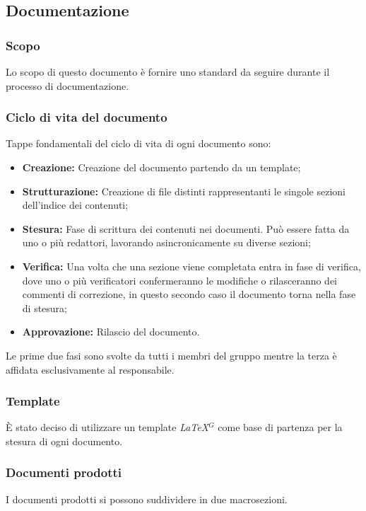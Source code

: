 \subsection{Documentazione}

\subsubsection{Scopo}
Lo scopo di questo documento è fornire uno standard da seguire durante il processo di documentazione.

\subsubsection{Ciclo di vita del documento}
Tappe fondamentali del ciclo di vita di ogni documento sono:
  \begin{itemize}
    \item \textbf{Creazione:} Creazione del documento partendo da un template;
    \item \textbf{Strutturazione:} Creazione di file distinti rappresentanti le singole sezioni dell'indice dei contenuti;
    \item \textbf{Stesura:} Fase di scrittura dei contenuti nei documenti. Può essere fatta da uno o più redattori, lavorando asincronicamente su diverse sezioni;
    \item \textbf{Verifica:} Una volta che una sezione viene completata entra in fase di verifica, dove uno o più verificatori confermeranno le modifiche o rilasceranno dei commenti di correzione, in questo secondo caso il documento torna nella fase di stesura;
    \item \textbf{Approvazione:} Rilascio del documento.
  \end{itemize}
  Le prime due fasi sono svolte da tutti i membri del gruppo mentre la terza è affidata esclusivamente al responsabile.

\subsubsection{Template}
È stato deciso di utilizzare un template \emph{\LaTeX}$^{G}$ come base di partenza per la stesura di ogni documento.

\subsubsection{Documenti prodotti}
I documenti prodotti si possono suddividere in due macrosezioni.

